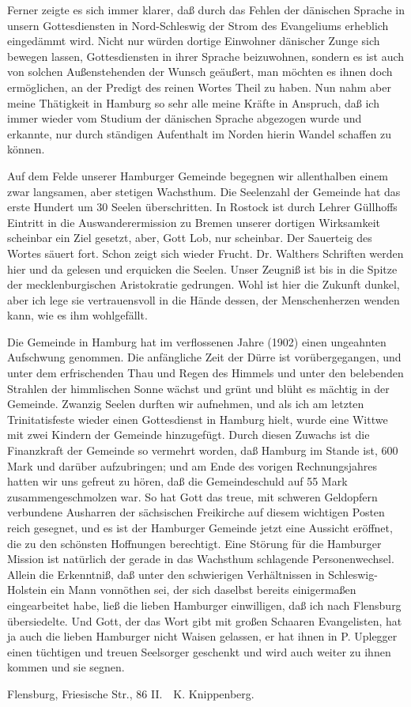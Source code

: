 Ferner zeigte es sich immer klarer, daß durch das Fehlen der dänischen Sprache in unsern Gottesdiensten in Nord-Schleswig der Strom des Evangeliums erheblich eingedämmt wird. Nicht nur würden dortige Einwohner dänischer Zunge sich bewegen lassen, Gottesdiensten in ihrer Sprache beizuwohnen, sondern es ist auch von solchen Außenstehenden der Wunsch geäußert, man möchten es ihnen doch ermöglichen, an der Predigt des reinen Wortes Theil zu haben. Nun nahm aber meine Thätigkeit in Hamburg so sehr alle meine Kräfte in Anspruch, daß ich immer wieder vom Studium der dänischen Sprache abgezogen wurde und erkannte, nur durch ständigen Aufenthalt im Norden hierin Wandel schaffen zu können.

Auf dem Felde unserer Hamburger Gemeinde begegnen wir allenthalben einem zwar langsamen, aber stetigen Wachsthum. Die Seelenzahl der Gemeinde hat das erste Hundert um 30 Seelen überschritten. In Rostock ist durch Lehrer Güllhoffs Eintritt in die Auswanderermission zu Bremen unserer dortigen Wirksamkeit scheinbar ein Ziel gesetzt, aber, Gott Lob, nur scheinbar. Der Sauerteig des Wortes säuert fort. Schon zeigt sich wieder Frucht. Dr. Walthers Schriften werden hier und da gelesen und erquicken die Seelen. Unser Zeugniß ist bis in die Spitze der mecklenburgischen Aristokratie gedrungen. Wohl ist hier die Zukunft dunkel, aber ich lege sie vertrauensvoll in die Hände dessen, der Menschenherzen wenden kann, wie es ihm wohlgefällt.

Die Gemeinde in Hamburg hat im verflossenen Jahre (1902) einen ungeahnten Aufschwung genommen. Die anfängliche Zeit der Dürre ist vorübergegangen, und unter dem erfrischenden Thau und Regen des Himmels und unter den belebenden Strahlen der himmlischen Sonne wächst und grünt und blüht es mächtig in der Gemeinde. Zwanzig Seelen durften wir aufnehmen, und als ich am letzten Trinitatisfeste wieder einen Gottesdienst in Hamburg hielt, wurde eine Wittwe mit zwei Kindern der Gemeinde hinzugefügt. Durch diesen Zuwachs ist die Finanzkraft der Gemeinde so vermehrt worden, daß Hamburg im Stande ist, 600 Mark und darüber aufzubringen; und am Ende des vorigen Rechnungsjahres hatten wir uns gefreut zu hören, daß die Gemeindeschuld auf 55 Mark zusammengeschmolzen war. So hat Gott das treue, mit schweren Geldopfern verbundene Ausharren der sächsischen Freikirche auf diesem wichtigen Posten reich gesegnet, und es ist der Hamburger Gemeinde jetzt eine Aussicht eröffnet, die zu den schönsten Hoffnungen berechtigt. Eine Störung für die Hamburger Mission ist natürlich der gerade in das Wachsthum schlagende Personenwechsel. Allein die Erkenntniß, daß unter den schwierigen Verhältnissen in Schleswig-Holstein ein Mann vonnöthen sei, der sich daselbst bereits einigermaßen eingearbeitet habe, ließ die lieben Hamburger einwilligen, daß ich nach Flensburg übersiedelte. Und Gott, der das Wort gibt mit großen Schaaren Evangelisten, hat ja auch die lieben Hamburger nicht Waisen gelassen, er hat ihnen in P. Uplegger einen tüchtigen und treuen Seelsorger geschenkt und wird auch weiter zu ihnen kommen und sie segnen.

Flensburg, Friesische Str., 86 II. K. Knippenberg.

